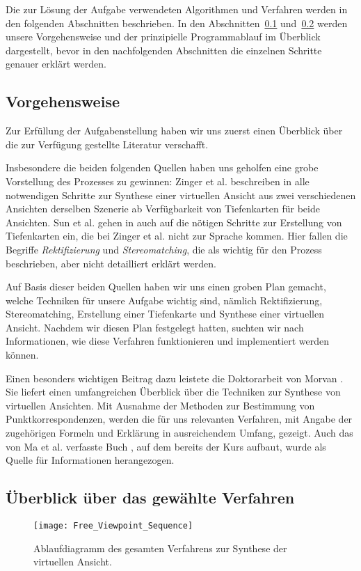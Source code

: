 Die zur Lösung der Aufgabe verwendeten Algorithmen und Verfahren werden in den folgenden Abschnitten beschrieben.
In den Abschnitten~\ref{subsec:vorgehensweise} und~\ref{subsec:ueberblick_verfahren} werden unsere Vorgehensweise und der prinzipielle Programmablauf im Überblick dargestellt, bevor in den nachfolgenden Abschnitten die einzelnen Schritte genauer erklärt werden.

\subsection{Vorgehensweise}
\label{subsec:vorgehensweise}
Zur Erfüllung der Aufgabenstellung haben wir uns zuerst einen Überblick über die zur Verfügung gestellte Literatur verschafft.

Insbesondere die beiden folgenden Quellen haben uns geholfen eine grobe Vorstellung des Prozesses zu gewinnen: Zinger et al. beschreiben in \cite{Zinger} alle notwendigen Schritte zur Synthese einer virtuellen Ansicht aus zwei verschiedenen Ansichten derselben Szenerie ab Verfügbarkeit von Tiefenkarten für beide Ansichten. Sun et al. gehen in \cite{Sun} auch auf die nötigen Schritte zur Erstellung von Tiefenkarten ein, die bei Zinger et al. nicht zur Sprache kommen. Hier fallen die Begriffe \textit{Rektifizierung} und \textit{Stereomatching}, die als wichtig für den Prozess beschrieben, aber nicht detailliert erklärt werden.

Auf Basis dieser beiden Quellen haben wir uns einen groben Plan gemacht, welche Techniken für unsere Aufgabe wichtig sind, nämlich Rektifizierung, Stereomatching, Erstellung einer Tiefenkarte und Synthese einer virtuellen Ansicht. Nachdem wir diesen Plan festgelegt hatten, suchten wir nach Informationen, wie diese Verfahren funktionieren und implementiert werden können.

Einen besonders wichtigen Beitrag dazu leistete die Doktorarbeit von Morvan \cite{Morvan}. Sie liefert einen umfangreichen Überblick über die Techniken zur Synthese von virtuellen Ansichten. Mit Ausnahme der Methoden zur Bestimmung von Punktkorrespondenzen, werden die für uns relevanten Verfahren, mit Angabe der zugehörigen Formeln und Erklärung in ausreichendem Umfang, gezeigt. Auch das von Ma et al. verfasste Buch \cite{Ma}, auf dem bereits der Kurs aufbaut, wurde als Quelle für Informationen herangezogen.

\subsection{Überblick über das gewählte Verfahren}
\label{subsec:ueberblick_verfahren}
\begin{figure}[!hp]
	\centering
	\texttt{[image: Free\_Viewpoint\_Sequence]}
	\caption{Ablaufdiagramm des gesamten Verfahrens zur Synthese der virtuellen Ansicht.}
	\label{fig:Ablaufdiagramm}
\end{figure}


